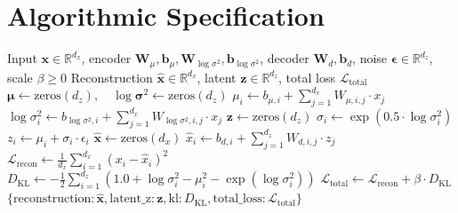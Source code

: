 \documentclass[11pt,a4paper]{article}
\theoremstyle{definition}
\begin{document}
\section{Algorithmic Specification}

\begin{algorithm}[H]
\caption{Variational Autoencoder Forward Pass and Loss Evaluation}
\label{alg:vae}
\begin{algorithmic}[1]
\Require Input $\mathbf{x} \in \mathbb{R}^{d_x}$, encoder $\mathbf{W}_\mu, \mathbf{b}_\mu, \mathbf{W}_{\log \sigma^2}, \mathbf{b}_{\log \sigma^2}$, decoder $\mathbf{W}_d, \mathbf{b}_d$, noise $\boldsymbol{\epsilon} \in \mathbb{R}^{d_z}$, scale $\beta \ge 0$
\Ensure Reconstruction $\hat{\mathbf{x}} \in \mathbb{R}^{d_x}$, latent $\mathbf{z} \in \mathbb{R}^{d_z}$, total loss $\mathcal{L}_{\text{total}}$
\State $\boldsymbol{\mu} \gets \text{zeros}(d_z), \quad \log \boldsymbol{\sigma}^2 \gets \text{zeros}(d_z)$
    \State $\mu_i \gets b_{\mu, i} + \sum_{j=1}^{d_x} W_{\mu, i, j} \cdot x_j$
    \State $\log \sigma_i^2 \gets b_{\log \sigma^2, i} + \sum_{j=1}^{d_x} W_{\log \sigma^2, i, j} \cdot x_j$
\EndFor
\State $\mathbf{z} \gets \text{zeros}(d_z)$
    \State $\sigma_i \gets \exp(0.5 \cdot \log \sigma_i^2)$
    \State $z_i \gets \mu_i + \sigma_i \cdot \epsilon_i$ 
\EndFor
\State $\hat{\mathbf{x}} \gets \text{zeros}(d_x)$
    \State $\hat{x}_i \gets b_{d, i} + \sum_{j=1}^{d_z} W_{d, i, j} \cdot z_j$
\EndFor
\State $\mathcal{L}_{\text{recon}} \gets \frac{1}{d_x} \sum_{i=1}^{d_x} (x_i - \hat{x}_i)^2$
\State $D_{\text{KL}} \gets -\frac{1}{2} \sum_{i=1}^{d_z} (1.0 + \log \sigma_i^2 - \mu_i^2 - \exp(\log \sigma_i^2))$
\State $\mathcal{L}_{\text{total}} \gets \mathcal{L}_{\text{recon}} + \beta \cdot D_{\text{KL}}$
\State \Return $\{\text{reconstruction}: \hat{\mathbf{x}}, \text{latent\_z}: \mathbf{z}, \text{kl}: D_{\text{KL}}, \text{total\_loss}: \mathcal{L}_{\text{total}}\}$
\end{algorithmic}
\end{algorithm}
\end{document}
